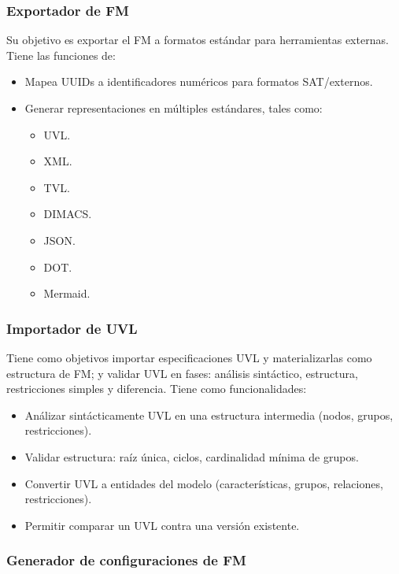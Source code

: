 \subsubsection{Exportador de \ac{FM}}

Su objetivo es exportar el \ac{FM} a formatos estándar para herramientas externas. Tiene las funciones de:
\begin{itemize}
	\item Mapea \ac{UUID}s a identificadores numéricos para formatos \ac{SAT}/externos.
	\item Generar representaciones en múltiples estándares, tales como:
	\begin{itemize}
		\item \ac{UVL}.
		\item \ac{XML}.
		\item \ac{TVL}.
		\item \ac{DIMACS}.
		\item \ac{JSON}.
		\item \ac{DOT}.
		\item Mermaid.
	\end{itemize}
\end{itemize}

\subsubsection{Importador de \ac{UVL}}

Tiene como objetivos importar especificaciones \ac{UVL} y materializarlas como estructura de \ac{FM}; y
validar \ac{UVL} en fases: análisis sintáctico, estructura, restricciones simples y diferencia. Tiene como funcionalidades:
\begin{itemize}
	\item Análizar sintácticamente \ac{UVL} en una estructura intermedia (nodos, grupos, restricciones).
	\item Validar estructura: raíz única, ciclos, cardinalidad mínima de grupos.
	\item Convertir \ac{UVL} a entidades del modelo (características, grupos, relaciones, restricciones).
	\item Permitir comparar un \ac{UVL} contra una versión existente.
\end{itemize}

\subsubsection{Generador de configuraciones de \ac{FM}}

